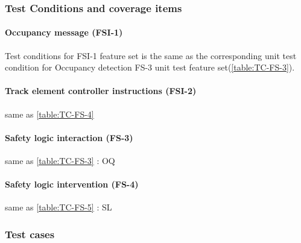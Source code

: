 
\subsubsection{Test Conditions and coverage items}
\paragraph{Occupancy message (FSI-1)} Test conditions for FSI-1 feature set is the same as the corresponding unit test condition for Occupancy detection FS-3 unit test feature set(\autoref{table:TC-FS-3}).
\paragraph{Track element controller instructions (FSI-2)} same as \autoref{table:TC-FS-4}
\paragraph{Safety logic interaction (FS-3)} same as \autoref{table:TC-FS-3} : OQ
\paragraph{Safety logic intervention (FS-4)} same as \autoref{table:TC-FS-5} : SL
\subsubsection{Test cases}

